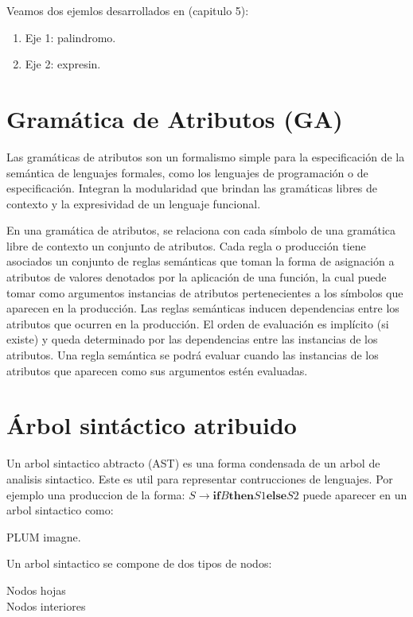 Veamos dos ejemlos desarrollados en \cite{gramatica} (capitulo 5):
\begin{enumerate}
\item Eje 1: palindromo.
\item Eje 2: expresin.
\end{enumerate}
 

\section{Gramática de Atributos (GA)}

Las gramáticas de atributos son un formalismo simple para la especificación de la semántica de lenguajes formales, como los lenguajes de programación o de especificación. Integran la modularidad que brindan las gramáticas libres de contexto y la expresividad de un lenguaje funcional.

En una gramática de atributos, se relaciona con cada símbolo de una gramática libre de contexto un conjunto de atributos. Cada regla o producción tiene asociados un conjunto de reglas semánticas que toman la forma de asignación a atributos de valores denotados por la aplicación de una función, la cual puede tomar como argumentos instancias de atributos pertenecientes a los símbolos que aparecen en la producción.
Las reglas semánticas inducen dependencias entre los atributos que ocurren en la producción. El orden de evaluación es implícito (si existe) y queda determinado por las dependencias entre las instancias de los atributos.
Una regla semántica se podrá evaluar cuando las instancias de los atributos que aparecen como sus argumentos estén evaluadas. 



\section{Árbol sintáctico atribuido}

Un arbol sintactico abtracto (AST) es una forma condensada de un arbol de analisis sintactico. Este es util para representar contrucciones de lenguajes. Por ejemplo una produccion de la forma: $ S \rightarrow \textbf{if} B \textbf{then} S1 \textbf{else} S2 $ puede aparecer en un arbol sintactico como:

PLUM imagne.

Un arbol sintactico se compone de dos tipos de nodos:
\begin{description}
\item [Nodos hojas]
\item [Nodos interiores]
\end{description}

